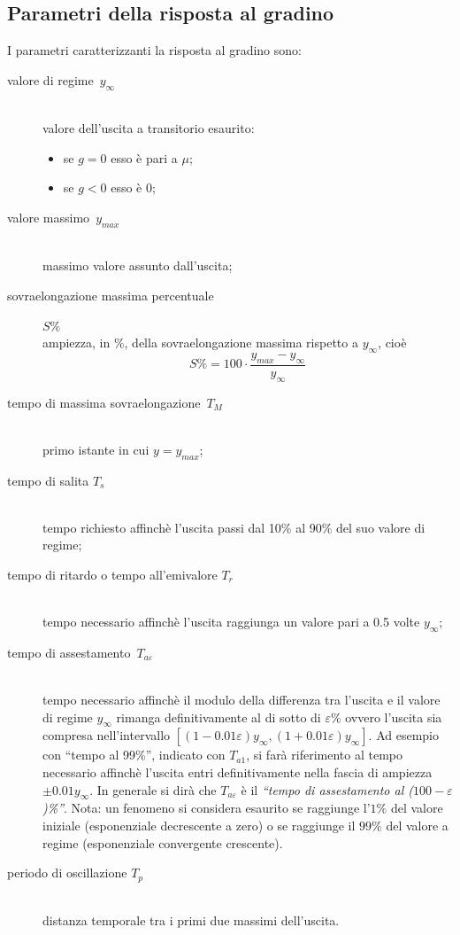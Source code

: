 \documentclass[a4paper]{report}
\begin{document}
\subsection{Parametri della risposta al gradino}
I parametri caratterizzanti la risposta al gradino sono:
\begin{description}
\item[valore di regime~$y_\infty$] \hfill \\
  valore dell'uscita a transitorio esaurito:
  \begin{itemize}
  \item se $g = 0$ esso \`e pari a $\mu$; 
  \item se $g < 0$ esso \`e 0;
  \end{itemize}
\item[valore massimo~$y_{max}$]\hfill \\
  massimo valore assunto dall'uscita;
\item[sovraelongazione massima percentuale] $S\%$ \hfill \\
  ampiezza, in \%, della sovraelongazione massima rispetto a
  $y_\infty$, cio\`e
  \begin{displaymath}
    S\% = 100 \cdot \dfrac{y_{max}-y_\infty}{y_\infty}
  \end{displaymath}
\item[tempo di massima sovraelongazione~$T_M$] \hfill \\
  primo istante in cui $y = y_{max}$;
\item[tempo di salita $T_s$] \hfill \\
  tempo richiesto affinch\`e l'uscita passi dal 10\% al 90\% del suo
  valore di regime;
\item[tempo di ritardo o tempo all'emivalore $T_r$] \hfill \\ tempo
  necessario affinch\`e l'uscita raggiunga un valore pari a 0.5 volte
  $y_\infty$; 
\item[tempo di assestamento~$T_{a\varepsilon}$] \hfill \\
  tempo necessario affinch\`e il modulo della differenza tra l'uscita
  e il valore di regime
  $y_\infty$ rimanga definitivamente al di sotto di $\varepsilon\%$
  ovvero l'uscita sia compresa nell'intervallo
  $[(1-0.01\varepsilon)y_\infty,(1+0.01\varepsilon)y_\infty]$. Ad
  esempio con ``tempo al 99\%'', indicato con $T_{a1}$, si far\`a
  riferimento al tempo necessario affinch\`e l'uscita entri
  definitivamente nella fascia di ampiezza $\pm 0.01 y_\infty$. In
  generale si dir\`a che $T_{a\varepsilon}$ \`e il \emph{``tempo di
    assestamento al ($100-\varepsilon$)\%''}.
  Nota: un fenomeno si considera esaurito se raggiunge l'$1\%$ del
  valore iniziale (esponenziale decrescente a zero) o se raggiunge il
  $99\%$ del valore a regime (esponenziale convergente crescente).
\item[periodo di oscillazione $T_p$] \hfill \\
  distanza temporale tra i primi due massimi dell'uscita.
\end{description}
\end{document}
